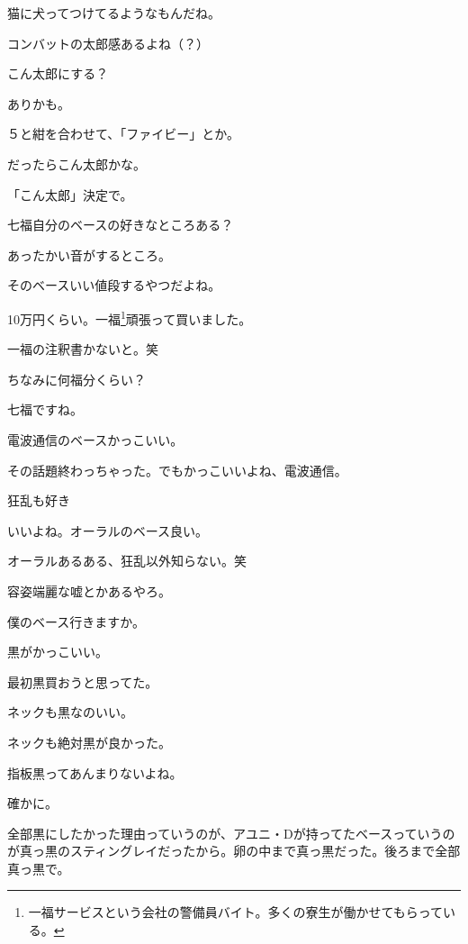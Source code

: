 \begin{multicols}{3}
猫に犬ってつけてるようなもんだね。

コンバットの太郎感あるよね（？）

こん太郎にする？

ありかも。

５と紺を合わせて、「ファイビー」とか。

だったらこん太郎かな。

「こん太郎」決定で。
 

七福自分のベースの好きなところある？

あったかい音がするところ。

そのベースいい値段するやつだよね。

10万円くらい。一福\footnote{一福サービスという会社の警備員バイト。多くの寮生が働かせてもらっている。}頑張って買いました。

一福の注釈書かないと。笑

ちなみに何福分くらい？

七福ですね。
 

電波通信のベースかっこいい。

その話題終わっちゃった。でもかっこいいよね、電波通信。

狂乱も好き

いいよね。オーラルのベース良い。

オーラルあるある、狂乱以外知らない。笑

容姿端麗な嘘とかあるやろ。
 

僕のベース行きますか。

黒がかっこいい。

最初黒買おうと思ってた。

ネックも黒なのいい。

ネックも絶対黒が良かった。

指板黒ってあんまりないよね。

確かに。

全部黒にしたかった理由っていうのが、アユニ・Dが持ってたベースっていうのが真っ黒のスティングレイだったから。卵の中まで真っ黒だった。後ろまで全部真っ黒で。


\end{multicols}
